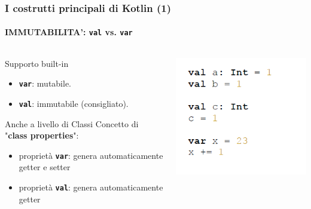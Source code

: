    \begin{frame}
      \frametitle{I costrutti principali di Kotlin (1)}
      \framesubtitle{IMMUTABILITA': \textbf{\texttt{val}} vs. \textbf{\texttt{var}}}
      \begin{columns}
        \begin{column}{0.47\textwidth}
          \begin{block}{Supporto built-in}
            \begin{itemize}
              \item \textbf{\texttt{var}}: mutabile.
              \item \textbf{\texttt{val}}: immutabile (consigliato).
            \end{itemize}
          \end{block}
          \begin{block}{Anche a livello di Classi}
            Concetto di "\textbf{class properties}":
            \begin{itemize}
              \item proprietà \textbf{\texttt{var}}: \alert{genera} automaticamente getter e setter
              \item proprietà \textbf{\texttt{val}}: \alert{genera} automaticamente getter
            \end{itemize}
          \end{block}
        \end{column}
        \begin{column}{0.5\textwidth}
            \includegraphics[scale=0.75]{Immutability}
        \end{column}
      \end{columns}
    \end{frame}

